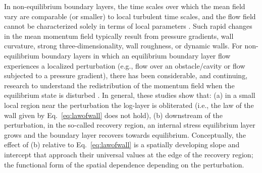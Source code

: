 In non-equilibrium boundary layers, the time scales over which the mean field vary are comparable (or smaller) to local turbulent time scales, and the flow field cannot be characterized solely in terms of local parameters \cite{townsend1976}. Such rapid changes in the mean momentum field typically result from pressure gradients, wall curvature, strong three-dimensionality, wall roughness, or dynamic walls. For non-equilibrium boundary layers in which an equilibrium boundary layer flow experiences a localized perturbation (e.g., flow over an obstacle/cavity or flow subjected to a pressure gradient), there has been considerable, and continuing, research to understand the redistribution of the momentum field when the equilibrium state is disturbed \cite{Antonia1977, Bradshaw1972a, Bandyopadhyay1993, Castro1998}. In general, these studies show that: (a) in a small local region near the perturbation the log-layer is obliterated (i.e., the law of the wall given by Eq.~\ref{eq:lawofwall} does not hold), (b) downstream of the perturbation, in the so-called recovery region, an internal stress equilibrium layer grows and the boundary layer recovers towards equilibrium. Conceptually, the effect of (b) relative to Eq.~\ref{eq:lawofwall} is a spatially developing slope and intercept that approach their universal values at the edge of the recovery region; the functional form of the spatial dependence depending on the perturbation. 

